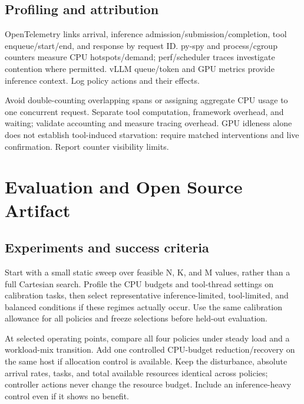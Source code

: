\documentclass[10pt]{article}
\begin{document}
\hypertarget{profiling-and-attribution}{%
\subsection{Profiling and attribution}\label{profiling-and-attribution}}

OpenTelemetry links arrival, inference admission/submission/completion,
tool enqueue/start/end, and response by request ID. py-spy and
process/cgroup counters measure CPU hotspots/demand; perf/scheduler
traces investigate contention where permitted. vLLM queue/token and GPU
metrics provide inference context. Log policy actions and their effects.

Avoid double-counting overlapping spans or assigning aggregate CPU usage
to one concurrent request. Separate tool computation, framework
overhead, and waiting; validate accounting and measure tracing overhead.
GPU idleness alone does not establish tool-induced starvation: require
matched interventions and live confirmation. Report counter visibility
limits.

\hypertarget{evaluation-and-open-source-artifact}{%
\section{Evaluation and Open Source
Artifact}\label{evaluation-and-open-source-artifact}}

\hypertarget{experiments-and-success-criteria}{%
\subsection{Experiments and success
criteria}\label{experiments-and-success-criteria}}

Start with a small static sweep over feasible N, K, and M values, rather
than a full Cartesian search. Profile the CPU budgets and tool-thread
settings on calibration tasks, then select representative
inference-limited, tool-limited, and balanced conditions if these
regimes actually occur. Use the same calibration allowance for all
policies and freeze selections before held-out evaluation.

At selected operating points, compare all four policies under steady
load and a workload-mix transition. Add one controlled CPU-budget
reduction/recovery on the same host if allocation control is available.
Keep the disturbance, absolute arrival rates, tasks, and total available
resources identical across policies; controller actions never change the
resource budget. Include an inference-heavy control even if it shows no
benefit.
\end{document}
